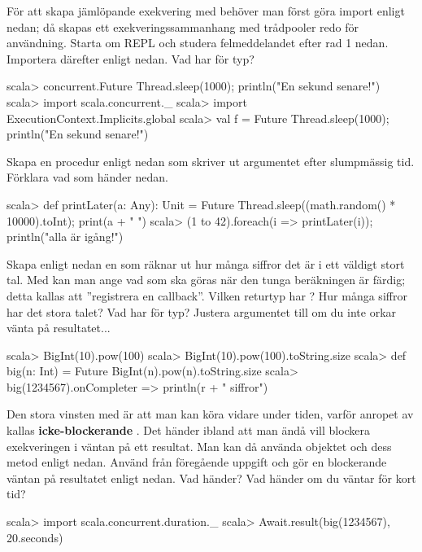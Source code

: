 \Subtask För att skapa jämlöpande exekvering med  behöver man först göra import enligt nedan; då skapas ett exekveringssammanhang med trådpooler redo för användning. Starta om REPL och studera felmeddelandet efter rad 1 nedan. Importera därefter enligt nedan. Vad har  för typ?
\begin{REPL}
scala> concurrent.Future { Thread.sleep(1000); println("En sekund senare!") }
scala> import scala.concurrent._
scala> import ExecutionContext.Implicits.global
scala> val f = Future { Thread.sleep(1000); println("En sekund senare!") }
\end{REPL}

\Subtask Skapa en procedur  enligt nedan som skriver ut argumentet efter slumpmässig tid. Förklara vad som händer nedan.
\begin{REPL}
scala> def printLater(a: Any): Unit =
         Future { Thread.sleep((math.random() * 10000).toInt); print(a + " ") }
scala> (1 to 42).foreach(i => printLater(i)); println("alla är igång!")
\end{REPL}

\Subtask Skapa enligt nedan en  som räknar ut hur många siffror det är i ett väldigt stort tal. Med  kan man ange vad som ska göras när den tunga beräkningen är färdig; detta kallas att ''registrera en callback''. Vilken returtyp har ? Hur många siffror har det stora talet? Vad har  för typ? Justera argumentet till  om du inte orkar vänta på resultatet...

\begin{REPL}
scala> BigInt(10).pow(100)
scala> BigInt(10).pow(100).toString.size
scala> def big(n: Int) = Future { BigInt(n).pow(n).toString.size }
scala> big(1234567).onComplete{r => println(r + " siffror") }
\end{REPL}

\Subtask Den stora vinsten med  är att man kan köra vidare under tiden, varför anropet av  kallas \textbf{icke-blockerande} . Det händer ibland att man ändå vill blockera exekveringen i väntan på ett resultat. Man kan då använda objektet  och dess metod  enligt nedan. Använd  från föregående uppgift och gör en blockerande väntan på resultatet enligt nedan. Vad händer? Vad händer om du väntar för kort tid?

\begin{REPL}
scala> import scala.concurrent.duration._
scala> Await.result(big(1234567), 20.seconds)
\end{REPL}



